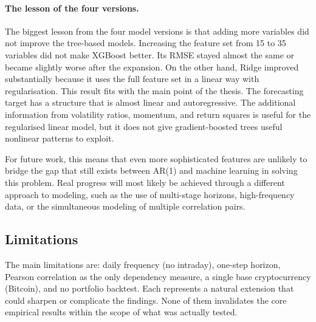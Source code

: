 \paragraph{The lesson of the four versions.}
The biggest lesson from the four model versions is that adding more variables did not improve the tree-based models. Increasing the feature set from 15 to 35 variables did not make XGBoost better. Its RMSE stayed almost the same or became slightly worse after the expansion. On the other hand, Ridge improved substantially because it uses the full feature set in a linear way with regularisation. This result fits with the main point of the thesis. The forecasting target has a structure that is almost linear and autoregressive. The additional information from volatility ratios, momentum, and return squares is useful for the regularised linear model, but it does not give gradient-boosted trees useful nonlinear patterns to exploit.

For future work, this means that even more sophisticated features are unlikely to bridge the gap that still exists between AR(1) and machine learning in solving this problem. Real progress will most likely be achieved through a different approach to modeling, such as the use of multi-stage horizons, high-frequency data, or the simultaneous modeling of multiple correlation pairs.

\subsection{Limitations}

The main limitations are: daily frequency (no intraday), one-step horizon, Pearson correlation as the only dependency measure, a single base cryptocurrency (Bitcoin), and no portfolio backtest. Each represents a natural extension that could sharpen or complicate the findings. None of them invalidates the core empirical results within the scope of what was actually tested.
